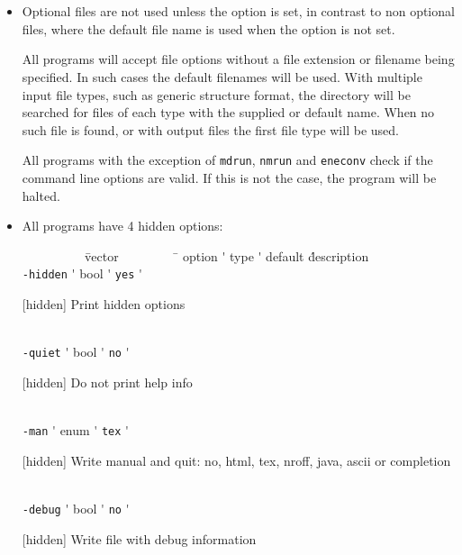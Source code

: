 \section{}


\section{}

\begin{itemize}
\item
Optional files are not used unless the option is set, in contrast to
non optional files, where the default file name is used when the
option is not set.

All {\gromacs} programs will accept file options without a file extension
or filename being specified. In such cases the default filenames will
be used. With multiple input file types, such as generic structure
format, the directory will be searched for files of each type with the
supplied or default name. When no such file is found, or with output
files the first file type will be used.

All {\gromacs} programs with the exception of {\tt mdrun},
{\tt nmrun} and {\tt eneconv} check if the command line options
are valid. If this is not the case, the program will be halted.

\item
All {\gromacs} programs have 4 hidden options:\\
\vspace{-5ex}
\begin{tabbing}
{\tt ~~~~~~~~~} \= vector \= {\tt ~~~~~~~~} \= \kill
\> option \'\> type \'\> default \' description \\
\> {\tt -hidden} \'\> bool \'\> {\tt    yes} \' \parbox[t]{0.7\linewidth}{[hidden] Print hidden options}\\
\> {\tt -quiet} \'\> bool \'\> {\tt     no} \' \parbox[t]{0.7\linewidth}{[hidden] Do not print help info}\\
\> {\tt -man} \'\> enum \'\> {\tt tex} \' \parbox[t]{0.7\linewidth}{[hidden] Write manual and quit: no, html, tex, nroff, java, ascii or completion}\\
\> {\tt -debug} \'\> bool \'\> {\tt     no} \' \parbox[t]{0.7\linewidth}{[hidden] Write file with debug information}\\
\end{tabbing}
\vspace{-5ex}


\end{itemize}
